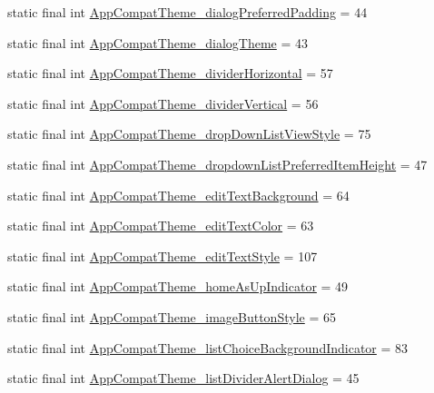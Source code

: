 \begin{CompactItemize}
\item 
static final int \hyperlink{classandroid_1_1support_1_1v4_1_1_r_1_1styleable_6100ebfbe6b8c50952783dcdd55473e4}{AppCompatTheme\_\-dialogPreferredPadding} = 44
\item 
static final int \hyperlink{classandroid_1_1support_1_1v4_1_1_r_1_1styleable_7b06171d505e781dc07ea55c3ea49e83}{AppCompatTheme\_\-dialogTheme} = 43
\item 
static final int \hyperlink{classandroid_1_1support_1_1v4_1_1_r_1_1styleable_e74ae6f850a84137337f5a8fc61e97a0}{AppCompatTheme\_\-dividerHorizontal} = 57
\item 
static final int \hyperlink{classandroid_1_1support_1_1v4_1_1_r_1_1styleable_2cbf4f6a6038a3c0ee43fa2d8baf13be}{AppCompatTheme\_\-dividerVertical} = 56
\item 
static final int \hyperlink{classandroid_1_1support_1_1v4_1_1_r_1_1styleable_7f77b4643b5ac4aa9e62aa4fc9232548}{AppCompatTheme\_\-dropDownListViewStyle} = 75
\item 
static final int \hyperlink{classandroid_1_1support_1_1v4_1_1_r_1_1styleable_a0ae883a1cfc49924dd71cb9014f35b6}{AppCompatTheme\_\-dropdownListPreferredItemHeight} = 47
\item 
static final int \hyperlink{classandroid_1_1support_1_1v4_1_1_r_1_1styleable_1e59b88c396599d1ced4caa57c2a7264}{AppCompatTheme\_\-editTextBackground} = 64
\item 
static final int \hyperlink{classandroid_1_1support_1_1v4_1_1_r_1_1styleable_11e77e8da745db12ac42b8308e77940e}{AppCompatTheme\_\-editTextColor} = 63
\item 
static final int \hyperlink{classandroid_1_1support_1_1v4_1_1_r_1_1styleable_be5ae2f20868c09eec22ffbecbfd4bd3}{AppCompatTheme\_\-editTextStyle} = 107
\item 
static final int \hyperlink{classandroid_1_1support_1_1v4_1_1_r_1_1styleable_760d4c63c4342ad1814a4021ddbaf121}{AppCompatTheme\_\-homeAsUpIndicator} = 49
\item 
static final int \hyperlink{classandroid_1_1support_1_1v4_1_1_r_1_1styleable_55a07b8f677eb6c8883891c1f2cfcf74}{AppCompatTheme\_\-imageButtonStyle} = 65
\item 
static final int \hyperlink{classandroid_1_1support_1_1v4_1_1_r_1_1styleable_04b55514ebd83ea5a03fba7aec47f213}{AppCompatTheme\_\-listChoiceBackgroundIndicator} = 83
\item 
static final int \hyperlink{classandroid_1_1support_1_1v4_1_1_r_1_1styleable_76eadcfe0bf32602bc65706cb1655757}{AppCompatTheme\_\-listDividerAlertDialog} = 45

\end{CompactItemize}
